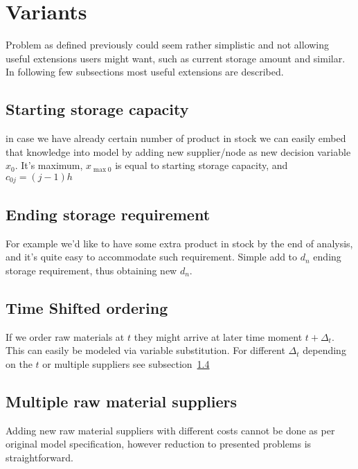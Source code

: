 \section{Variants}
\label{sec:Variants}

Problem as defined previously could seem rather simplistic and not allowing useful extensions users might want, such as current storage amount and similar. In following few subsections most useful extensions are described.

\subsection{Starting storage capacity}
in case we have already certain number of product in stock we can easily embed that knowledge into model by adding new supplier/node as new decision variable $x_0$. It's maximum, $x_{\max0}$ is equal to starting storage capacity, and $c_{0j} = \left( j - 1 \right) h$

\subsection{Ending storage requirement}
\label{subs:Ending storage requirement}
For example we'd like to have some extra product in stock by the end of analysis, and it's quite easy to accommodate such requirement. Simple add to $d_n$ ending storage requirement, thus obtaining new $d_n$.

\subsection{Time Shifted ordering}
\label{subs:Time Shifted ordering}
If we order raw materials at $t$ they might arrive at later time moment $t+\Delta_t$. This can easily be modeled via variable substitution. For different $\Delta_t$ depending on the $t$ or multiple suppliers see subsection~\ref{subs:Multiple raw material suppliers}

\subsection{Multiple raw material suppliers}
\label{subs:Multiple raw material suppliers}
Adding new raw material suppliers with different costs cannot be done as per original model specification, however reduction to presented problems is straightforward.

